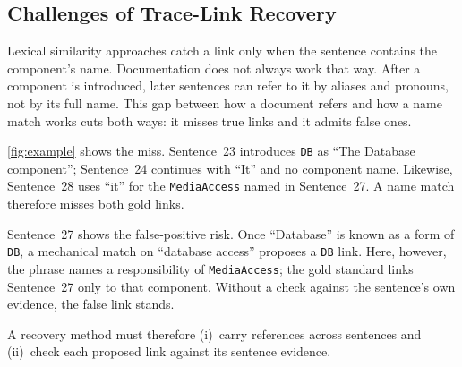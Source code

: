 \subsection{Challenges of Trace-Link Recovery}
Lexical similarity approaches catch a link only when the sentence contains the component's name.
Documentation does not always work that way.
After a component is introduced, later sentences can refer to it by aliases and pronouns, not by its full name.
This gap between how a document refers and how a name match works cuts both ways: it misses true links and it admits false ones.

\autoref{fig:example} shows the miss.
Sentence~23 introduces \texttt{DB} as ``The Database component''; Sentence~24 continues with ``It'' and no component name.
Likewise, Sentence~28 uses ``it'' for the \texttt{MediaAccess} named in Sentence~27.
A name match therefore misses both gold links.

Sentence~27 shows the false-positive risk.
Once ``Database'' is known as a form of \texttt{DB}, a mechanical match on ``database access'' proposes a \texttt{DB} link.
Here, however, the phrase names a responsibility of \texttt{MediaAccess}; the gold standard links Sentence~27 only to that component.
Without a check against the sentence's own evidence, the false link stands.

A recovery method must therefore (i)~carry references across sentences and (ii)~check each proposed link against its sentence evidence.

